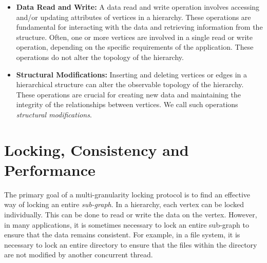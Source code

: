 \begin{itemize}

    
    \item \textbf{Data Read and Write:} A data read and write operation involves accessing and/or updating attributes of vertices in a hierarchy. These operations are fundamental for interacting with the data and retrieving information from the structure. Often, one or more vertices are involved in a single read or write operation, depending on the specific requirements of the application. These operations do not alter the topology of the hierarchy.

    \item \textbf{Structural Modifications:} Inserting and deleting vertices or edges in a hierarchical structure can alter the observable topology of the hierarchy. These operations are crucial for creating new data and maintaining the integrity of the relationships between vertices. We call such operations \emph{structural modifications}.
    

\end{itemize}

\section{Locking, Consistency and Performance}
The primary goal of a multi-granularity locking protocol is to find an effective way of locking an entire \emph{sub-graph}. In a hierarchy, each vertex can be locked individually. This can be done to read or write the data on the vertex. However, in many applications, it is sometimes necessary to lock an entire sub-graph to ensure that the data remains consistent. For example, in a file system, it is necessary to lock an entire directory to ensure that the files within the directory are not modified by another concurrent thread.


